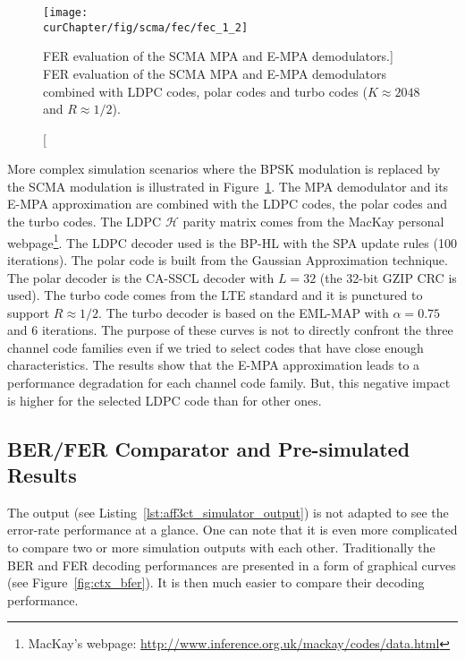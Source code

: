 \begin{figure}[htp]
  \centering
  \texttt{[image: \\curChapter/fig/scma/fec/fec\_1\_2]}
  \caption
    [FER evaluation of the SCMA MPA and E-MPA demodulators.]
    {FER evaluation of the SCMA MPA and E-MPA demodulators combined with LDPC
     codes, polar codes and turbo codes ($K \approx 2048$ and $R \approx 1/2$).}
  \label{plot:aff3ct_scma_fec}
\end{figure}

More complex simulation scenarios where the BPSK modulation is replaced by the
SCMA modulation is illustrated in Figure~\ref{plot:aff3ct_scma_fec}. The MPA
demodulator and its E-MPA approximation are combined with the LDPC codes, the
polar codes and the turbo codes. The LDPC $\mathcal{H}$ parity matrix comes from
the MacKay personal webpage\footnote{MacKay's webpage:
\url{http://www.inference.org.uk/mackay/codes/data.html}}. The LDPC decoder used
is the BP-HL with the SPA update rules (100 iterations). The polar code is built
from the Gaussian Approximation technique. The polar decoder is the CA-SSCL
decoder with $L=32$ (the 32-bit GZIP CRC is used). The turbo code comes from the
LTE standard and it is punctured to support $R \approx 1/2$. The turbo decoder
is based on the EML-MAP with $\alpha = 0.75$ and 6 iterations. The purpose of
these curves is not to directly confront the three channel code families even if
we tried to select codes that have close enough characteristics. The results
show that the E-MPA approximation leads to a performance degradation for each
channel code family. But, this negative impact is higher for the selected LDPC
code than for other ones.

\subsection{BER/FER Comparator and Pre-simulated Results}

The \AFFECT output (see Listing~\ref{lst:aff3ct_simulator_output}) is not
adapted to see the error-rate performance at a glance. One can note that it is
even more complicated to compare two or more simulation outputs with each other.
Traditionally the BER and FER decoding performances are presented in a form of
graphical curves (see Figure~\ref{fig:ctx_bfer}). It is then much easier to
compare their decoding performance.

